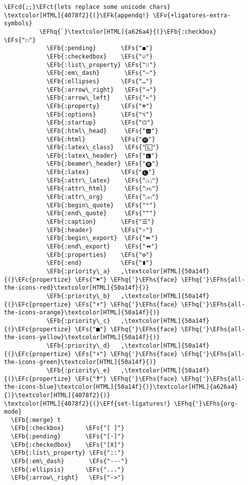 \documentclass{scrartcl}
\newcommand{\EFk}[1]{\textcolor{EFk}{#1}} %
\newcommand{\EFs}[1]{\textcolor{EFs}{#1}} %
\newcommand{\EFb}[1]{\textcolor{EFb}{#1}} %
\newcommand{\EFct}[1]{\textcolor{EFct}{#1}} %
\newcommand{\EFc}[1]{\textcolor{EFc}{#1}} %
\newcommand{\EFv}[1]{\textcolor{EFv}{#1}} %
\newcommand{\EFf}[1]{\textcolor{EFf}{#1}} %
\newcommand{\EFcd}[1]{\textcolor{EFcd}{#1}} %
\newcommand{\EFhq}[1]{\textcolor{EFhq}{#1}} %
\newcommand{\EFhs}[1]{\textcolor{EFhs}{#1}} %
\begin{document}
\begin{Code}
\begin{Verbatim}[]
\EFcd{;;}\EFct{lets replace some unicode chars}
\textcolor[HTML]{4078f2}{(}\EFk{appendq!} \EFv{+ligatures-extra-symbols}
          \EFhq{`}\textcolor[HTML]{a626a4}{(}\EFb{:checkbox}      \EFs{"☐"}
            \EFb{:pending}       \EFs{"◼"}
            \EFb{:checkedbox}    \EFs{"☑"}
            \EFb{:list\_property} \EFs{"∷"}
            \EFb{:em\_dash}       \EFs{"—"}
            \EFb{:ellipses}      \EFs{"…"}
            \EFb{:arrow\_right}   \EFs{"→"}
            \EFb{:arrow\_left}    \EFs{"←"}
            \EFb{:property}      \EFs{"☸"}
            \EFb{:options}       \EFs{"⌥"}
            \EFb{:startup}       \EFs{"⏻"}
            \EFb{:html\_head}     \EFs{"🅷"}
            \EFb{:html}          \EFs{"🅗"}
            \EFb{:latex\_class}   \EFs{"🄻"}
            \EFb{:latex\_header}  \EFs{"🅻"}
            \EFb{:beamer\_header} \EFs{"🅑"}
            \EFb{:latex}         \EFs{"🅛"}
            \EFb{:attr\_latex}    \EFs{"🄛"}
            \EFb{:attr\_html}     \EFs{"🄗"}
            \EFb{:attr\_org}      \EFs{"⒪"}
            \EFb{:begin\_quote}   \EFs{"❝"}
            \EFb{:end\_quote}     \EFs{"❞"}
            \EFb{:caption}       \EFs{"☰"}
            \EFb{:header}        \EFs{"›"}
            \EFb{:begin\_export}  \EFs{"⏩"}
            \EFb{:end\_export}    \EFs{"⏪"}
            \EFb{:properties}    \EFs{"⚙"}
            \EFb{:end}           \EFs{"∎"}
            \EFb{:priority\_a}   ,\textcolor[HTML]{50a14f}{(}\EFc{propertize} \EFs{"⚑"} \EFhq{'}\EFhs{face} \EFhq{'}\EFhs{all-the-icons-red}\textcolor[HTML]{50a14f}{)}
            \EFb{:priority\_b}   ,\textcolor[HTML]{50a14f}{(}\EFc{propertize} \EFs{"⬆"} \EFhq{'}\EFhs{face} \EFhq{'}\EFhs{all-the-icons-orange}\textcolor[HTML]{50a14f}{)}
            \EFb{:priority\_c}   ,\textcolor[HTML]{50a14f}{(}\EFc{propertize} \EFs{"■"} \EFhq{'}\EFhs{face} \EFhq{'}\EFhs{all-the-icons-yellow}\textcolor[HTML]{50a14f}{)}
            \EFb{:priority\_d}   ,\textcolor[HTML]{50a14f}{(}\EFc{propertize} \EFs{"⬇"} \EFhq{'}\EFhs{face} \EFhq{'}\EFhs{all-the-icons-green}\textcolor[HTML]{50a14f}{)}
            \EFb{:priority\_e}   ,\textcolor[HTML]{50a14f}{(}\EFc{propertize} \EFs{"❓"} \EFhq{'}\EFhs{face} \EFhq{'}\EFhs{all-the-icons-blue}\textcolor[HTML]{50a14f}{)}\textcolor[HTML]{a626a4}{)}\textcolor[HTML]{4078f2}{)}
\textcolor[HTML]{4078f2}{(}\EFf{set-ligatures!} \EFhq{'}\EFhs{org-mode}
  \EFb{:merge} t
  \EFb{:checkbox}      \EFs{"[ ]"}
  \EFb{:pending}       \EFs{"[-]"}
  \EFb{:checkedbox}    \EFs{"[X]"}
  \EFb{:list\_property} \EFs{"::"}
  \EFb{:em\_dash}       \EFs{"---"}
  \EFb{:ellipsis}      \EFs{"..."}
  \EFb{:arrow\_right}   \EFs{"->"}

\end{Verbatim}
\end{Code}
\end{document}
